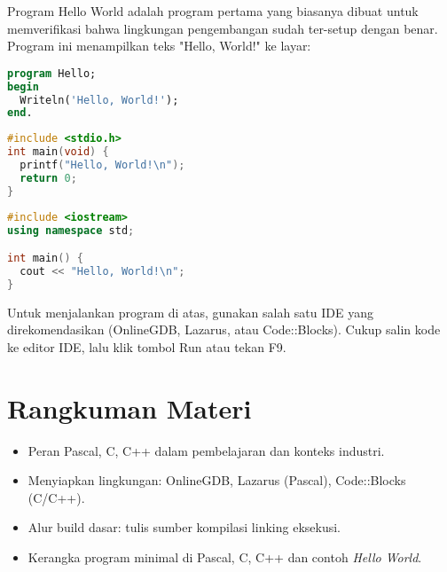 \documentclass[../main.tex]{subfiles}
\begin{document}
Program Hello World adalah program pertama yang biasanya dibuat untuk memverifikasi bahwa lingkungan pengembangan sudah ter-setup dengan benar. Program ini menampilkan teks "Hello, World!" ke layar:

\begin{lstlisting}[language=Pascal, caption={Hello World pada Pascal}]
program Hello;
begin
  Writeln('Hello, World!');
end.
\end{lstlisting}

\begin{lstlisting}[language=C, caption={Hello World pada C}]
#include <stdio.h>
int main(void) {
  printf("Hello, World!\n");
  return 0;
}
\end{lstlisting}

\begin{lstlisting}[language=C++, caption={Hello World pada C++}]
#include <iostream>
using namespace std;

int main() {
  cout << "Hello, World!\n";
}
\end{lstlisting}

Untuk menjalankan program di atas, gunakan salah satu IDE yang direkomendasikan (OnlineGDB, Lazarus, atau Code::Blocks). Cukup salin kode ke editor IDE, lalu klik tombol Run atau tekan F9.

\section{Rangkuman Materi}
\begin{itemize}
  \item Peran Pascal, C, C++ dalam pembelajaran dan konteks industri.
  \item Menyiapkan lingkungan: OnlineGDB, Lazarus (Pascal), Code::Blocks (C/C++).
  \item Alur build dasar: tulis sumber \textrightarrow{} kompilasi \textrightarrow{} linking \textrightarrow{} eksekusi.
  \item Kerangka program minimal di Pascal, C, C++ dan contoh \emph{Hello World}.
\end{itemize}
\end{document}
